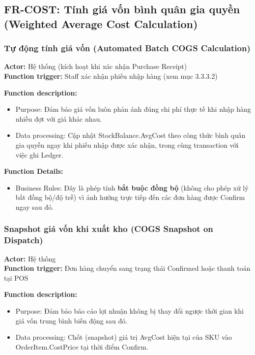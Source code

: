 \subsection{FR-COST: Tính giá vốn bình quân gia quyền (Weighted Average Cost Calculation)}

\subsubsection{Tự động tính giá vốn (Automated Batch COGS Calculation)}
\textbf{Actor:} Hệ thống (kích hoạt khi xác nhận Purchase Receipt) \\
\textbf{Function trigger:} Staff xác nhận phiếu nhập hàng (xem mục 3.3.3.2)

\textbf{Function description:}
\begin{itemize}
    \item Purpose: Đảm bảo giá vốn luôn phản ánh đúng chi phí thực tế khi nhập hàng nhiều đợt với giá khác nhau.
    \item Data processing: Cập nhật StockBalance.AvgCost theo công thức bình quân gia quyền ngay khi phiếu nhập được xác nhận, trong cùng transaction với việc ghi Ledger.
\end{itemize}

\textbf{Function Details:}
\begin{itemize}
    \item Business Rules: Đây là phép tính \textbf{bắt buộc đồng bộ} (không cho phép xử lý bất đồng bộ/độ trễ) vì ảnh hưởng trực tiếp đến các đơn hàng được Confirm ngay sau đó.
\end{itemize}

\subsubsection{Snapshot giá vốn khi xuất kho (COGS Snapshot on Dispatch)}
\textbf{Actor:} Hệ thống \\
\textbf{Function trigger:} Đơn hàng chuyển sang trạng thái Confirmed hoặc thanh toán tại POS

\textbf{Function description:}
\begin{itemize}
    \item Purpose: Đảm bảo báo cáo lợi nhuận không bị thay đổi ngược thời gian khi giá vốn trung bình biến động sau đó.
    \item Data processing: Chốt (snapshot) giá trị AvgCost hiện tại của SKU vào OrderItem.CostPrice tại thời điểm Confirm.
\end{itemize}

